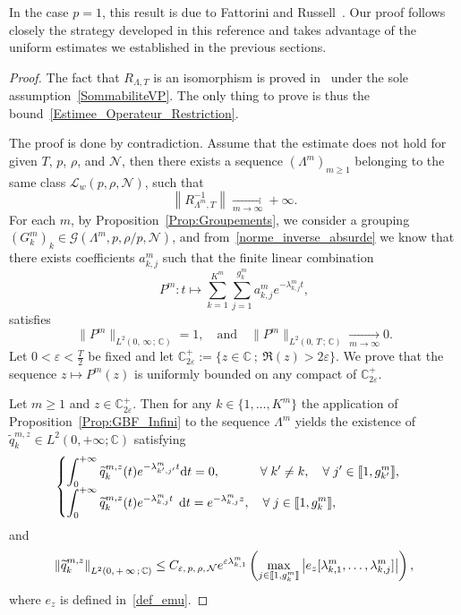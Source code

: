 \documentclass[AHL,Unicode,longabstracts]{cedram}
\newcommand{\llbracket}{\mathopen{[\mkern -2.7mu[}}
\newcommand{\rrbracket}{\mathclose{]\mkern -2.7mu]}}
\newcommand{\inter}[2]{\llbracket #1,#2 \rrbracket}
\newcommand{\n}{g}
\newcommand{\LL}{\mathcal{L}}
\newcommand{\NN}{\mathcal{N}}
\newcommand{\C}{\mathbb{C}}
\newcommand{\Cpeps}{\mathbb{C}^+_{2\varepsilon}}
\newcommand{\md}{\mathrm{d}}
\let\oldforall\forall
\renewcommand*{\forall}{\mathrel{\oldforall}}
\begin{document}
In the case $p=1$, this result is due to Fattorini and Russell~\cite[Theorem~1.3]{FattoriniRussell74}. Our proof follows closely the strategy developed in this reference and takes advantage of the uniform estimates we established in the previous sections.



\begin{proof}
The fact that $R_{\Lambda,T}$ is an isomorphism is proved in~\cite{SchwartzThese} under the sole assumption~\eqref{SommabiliteVP}. The only thing to prove is thus the bound~\eqref{Estimee_Operateur_Restriction}.

The proof is done by contradiction. Assume that the estimate does not hold for given $T$, $p$, $\rho$, and $\NN$, then there exists a sequence $(\Lambda^m)_{m \geq 1}$ belonging to the same class $\LL_w(p,\rho,\NN)$, such that
\begin{equation}\label{norme_inverse_absurde}
\left\|R_{\Lambda^m,T}^{-1}\right\| \xrightarrow[m\to \infty]{} +\infty.
\end{equation}
For each $m$, by Proposition~\ref{Prop:Groupements}, we consider a grouping $(G^m_k)_k\in \mathcal{G}(\Lambda^m,p,\rho/p,\NN)$, and from~\eqref{norme_inverse_absurde} we know that there exists coefficients $a_{k,j}^m$ such that the finite linear combination
\[
P^m : t \mapsto \sum_{k=1}^{K^m} \sum_{j=1}^{\n_k^m} a_{k,j}^m e^{-\lambda^m_{k,j} t},
\]
satisfies
\[
\|P^m\|_{L^2(0,\,\infty\,;\,\C)} = 1,
\quad \text{and} \quad
\|P^m\|_{L^2(0,\,T\,;\,\C)} \xrightarrow[m\to \infty]{} 0.
\]
Let $0 < \varepsilon < \frac{T}{2}$ be fixed and let $\Cpeps := \{z \in \C \: ; \: \Re(z)>2\varepsilon\}$. We prove that the sequence $z\mapsto P^m(z)$ is uniformly bounded on any compact of $\Cpeps$.

Let $m \geq 1$ and $z \in \Cpeps$. Then for any $k \in \{1, \dots, K^m \}$ the application of Proposition~\ref{Prop:GBF_Infini} to the sequence $\Lambda^m$ yields the existence of $\widetilde{q}_k^{m,z}\in L^2(0,+\infty;\C)$ satisfying
\begin{equation}\label{equations_qkmz}
\begin{cases}
\displaystyle\int_0^{+\infty} \widetilde{q}_k^{m,z}(t) e^{-\lambda^m_{k',j'} t} \md t = 0, \mkern58mu \forall k' \neq k, \quad \forall j'\in \inter{1}{\n^m_{k'}},
\\
\displaystyle\int_0^{+\infty} \widetilde{q}_k^{m,z}(t) e^{-\lambda^m_{k,j} t} \;\,\md t = e^{-\lambda^m_{k,j} z}, \quad \forall j \in \inter{1}{\n^m_k},
\end{cases}
\end{equation}
and
\[
\left\| \widetilde{q}_k^{m,z} \right\|_{L^2(0,\,+\,\infty\,;\,\C)} \leq C_{\varepsilon,\,p,\,\rho,\,\NN} e^{ \varepsilon \lambda^m_{k,1}} \left(\max_{j\in \inter{1}{\n^m_k}} \left| e_z[\lambda^m_{k,1},\dotsc,\lambda^m_{k,j}] \right| \right),
\]
where $e_z$ is defined in~\eqref{def_emu}.



\end{proof}
\end{document}
